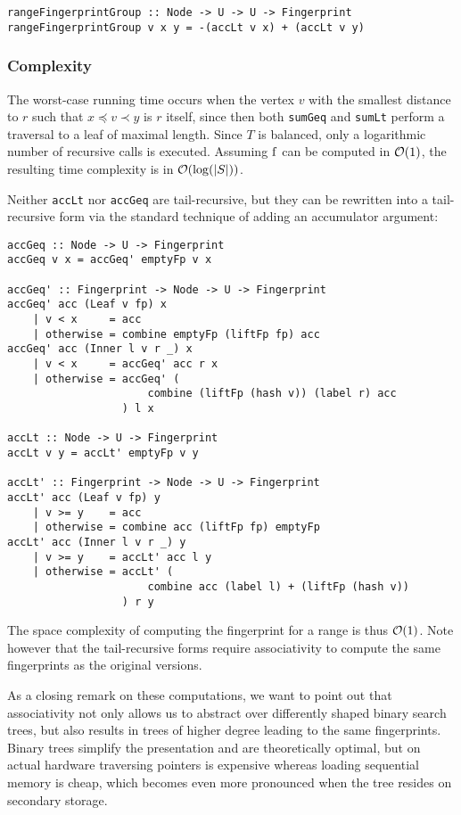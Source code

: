 \begin{verbatim}
rangeFingerprintGroup :: Node -> U -> U -> Fingerprint
rangeFingerprintGroup v x y = -(accLt v x) + (accLt v y)
\end{verbatim}

\subsubsection{Complexity}

The worst-case running time occurs when the vertex $v$ with the smallest distance to $r$ such that $x \preceq v \prec y$ is $r$ itself, since then both \texttt{sumGeq} and \texttt{sumLt} perform a traversal to a leaf of maximal length. Since $T$ is balanced, only a logarithmic number of recursive calls is executed. Assuming $\operatorname{f}$ can be computed in $\mathcal{O}(1)$, the resulting time complexity is in $\mathcal{O}(\log(|{S}|))$.

Neither \texttt{accLt} nor \texttt{accGeq} are tail-recursive, but they can be rewritten into a tail-recursive form via the standard technique of adding an accumulator argument:

\begin{verbatim}
accGeq :: Node -> U -> Fingerprint
accGeq v x = accGeq' emptyFp v x

accGeq' :: Fingerprint -> Node -> U -> Fingerprint
accGeq' acc (Leaf v fp) x
    | v < x     = acc
    | otherwise = combine emptyFp (liftFp fp) acc
accGeq' acc (Inner l v r _) x
    | v < x     = accGeq' acc r x
    | otherwise = accGeq' (
                      combine (liftFp (hash v)) (label r) acc
                  ) l x

accLt :: Node -> U -> Fingerprint
accLt v y = accLt' emptyFp v y

accLt' :: Fingerprint -> Node -> U -> Fingerprint
accLt' acc (Leaf v fp) y
    | v >= y    = acc
    | otherwise = combine acc (liftFp fp) emptyFp
accLt' acc (Inner l v r _) y
    | v >= y    = accLt' acc l y
    | otherwise = accLt' (
                      combine acc (label l) + (liftFp (hash v))
                  ) r y
\end{verbatim}

The space complexity of computing the fingerprint for a range is thus $\mathcal{O}(1)$. Note however that the tail-recursive forms require associativity to compute the same fingerprints as the original versions.

As a closing remark on these computations, we want to point out that associativity not only allows us to abstract over differently shaped binary search trees, but also results in trees of higher degree leading to the same fingerprints. Binary trees simplify the presentation and are theoretically optimal, but on actual hardware traversing pointers is expensive whereas loading sequential memory is cheap, which becomes even more pronounced when the tree resides on secondary storage.

